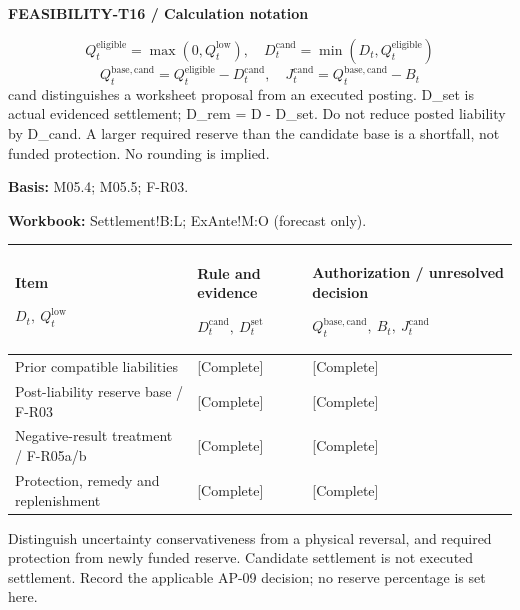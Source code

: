 \par\begingroup\sffamily\fontsize{8}{10}\selectfont\color{NEBGreen}\setlength{\parskip}{2pt}\setlength{\abovedisplayskip}{4pt}\setlength{\belowdisplayskip}{4pt}\setlength{\abovedisplayshortskip}{2pt}\setlength{\belowdisplayshortskip}{3pt}
\textbf{FEASIBILITY-T16 / Calculation notation}\par
{\fontsize{9}{11}\selectfont\[ Q_t^{\mathrm{eligible}}=\max(0,Q_t^{\mathrm{low}}),\quad D_t^{\mathrm{cand}}=\min(D_t,Q_t^{\mathrm{eligible}}) \]}
{\fontsize{9}{11}\selectfont\[ Q_t^{\mathrm{base,cand}}=Q_t^{\mathrm{eligible}}-D_t^{\mathrm{cand}},\quad J_t^{\mathrm{cand}}=Q_t^{\mathrm{base,cand}}-B_t \]}
cand distinguishes a worksheet proposal from an executed posting. D\_set is actual evidenced settlement; D\_rem = D - D\_set. Do not reduce posted liability by D\_cand. A larger required reserve than the candidate base is a shortfall, not funded protection. No rounding is implied.\par
\textbf{Basis:} M05.4; M05.5; F-R03.\par
\textbf{Workbook:} Settlement!B:L; ExAnte!M:O (forecast only).\par\endgroup
{\sffamily\fontsize{8.3}{10.3}\selectfont\begin{longtable}{@{}P{57.74mm} P{54.44mm} P{52.79mm}@{}}
\toprule
\textbf{Item}\par {\normalfont\fontsize{8.2}{10}\selectfont $D_t,\ Q_t^{\mathrm{low}}$} & \textbf{Rule and evidence}\par {\normalfont\fontsize{8.2}{10}\selectfont $D_t^{\mathrm{cand}},\ D_t^{\mathrm{set}}$} & \textbf{Authorization / unresolved decision}\par {\normalfont\fontsize{8.2}{10}\selectfont $Q_t^{\mathrm{base,cand}},\ B_t,\ J_t^{\mathrm{cand}}$}\\\midrule\endhead
\rule{0pt}{7.7mm}Prior compatible liabilities & [Complete] & [Complete]\\\hline
\rule{0pt}{7.7mm}Post-liability reserve base / F-R03 & [Complete] & [Complete]\\\hline
\rule{0pt}{7.7mm}Negative-result treatment / F-R05a/b & [Complete] & [Complete]\\\hline
\rule{0pt}{7.7mm}Protection, remedy and replenishment & [Complete] & [Complete]\\\hline
\end{longtable}}
\begin{Notice}Distinguish uncertainty conservativeness from a physical reversal, and required protection from newly funded reserve. Candidate settlement is not executed settlement. Record the applicable AP-09 decision; no reserve percentage is set here.\end{Notice}
